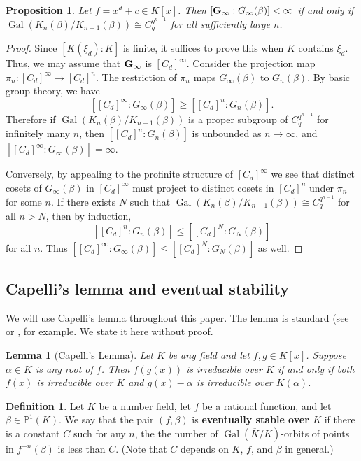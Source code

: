 \documentclass[11pt]{amsart}
\newtheorem{prop}[thm]{Proposition}
\newtheorem{lem}[thm]{Lemma}
\theoremstyle{definition}
\newtheorem{defn}[thm]{Definition}
\theoremstyle{definition}
\numberwithin{thm}{section}
\numberwithin{equation}{thm}
\newcommand{\bP}{\ensuremath{{\mathbb{P}}}}
\newcommand{\Kbar}{\ensuremath {\overline K}}
\DeclareMathOperator{\Gal}{Gal}
\begin{document}
\begin{prop}\label{indexprop}
Let $f=x^d+c\in K[x]$. Then $[{\bf G}_{\infty}: G_\infty(\beta)]<\infty$ if and only if $\Gal(K_n(\beta)/K_{n-1}(\beta))\cong C_q^{q^{n-1}}$ 
for all sufficiently large $n$.
\end{prop}
\begin{proof}
 Since $[K(\xi_d):K]$ is finite, it suffices to prove this when
 $K$ contains $\xi_d$.  Thus, we may assume that ${\bf G}_\infty$ is
 $[C_d]^\infty$.  
Consider the projection map $\pi_n:[C_d]^\infty\to[C_d]^n$. The restriction of $\pi_n$ maps $G_\infty(\beta)$ to 
$G_n(\beta)$. By basic group theory, we have
\[
[[C_d]^\infty:G_\infty(\beta)]\geq [[C_d]^n:G_n(\beta)].
\]
Therefore if $\Gal(K_n(\beta)/K_{n-1}(\beta))$ is a proper subgroup of $C_q^{q^{n-1}}$ for infinitely many $n$, then 
$[[C_d]^n:G_n(\beta)]$ is unbounded as $n\to\infty$, and $[[C_d]^\infty:G_\infty(\beta)]=\infty$.

Conversely, by appealing to the profinite structure of $[C_d]^\infty$ we see that distinct cosets of $G_\infty(\beta)$ in $[C_d]^\infty$ must 
project to distinct cosets in $[C_d]^n$ under $\pi_n$ for some $n$. If there exists $N$ such that $\Gal(K_n(\beta)/K_{n-1}(\beta))\cong C_q^{q^{n-1}}$ for all $n > N$, then by induction, 
\[[[C_d]^n:G_n(\beta)]\leq [[C_d]^N:G_N(\beta)]\] for all $n$. Thus $[[C_d]^\infty:G_\infty(\beta)]\leq [[C_d]^N:G_N(\beta)]$ as well.
\end{proof}


\subsection{Capelli's lemma and eventual stability}

We will use Capelli's lemma throughout this paper.  The lemma is
standard (see \cite{OdoniWreathProducts} or \cite[Lemma 4.1]{BT2}, for
example.  We state it here without proof.


\begin{lem}[Capelli's Lemma] \label{cap} 
Let $K$ be any field and let $f,g\in K[x]$. Suppose $\alpha\in\Kbar$ is any root of $f$. 
Then $f(g(x))$ is irreducible over $K$ if and only if both $f(x)$ is irreducible over $K$ and $g(x)-\alpha$ 
is irreducible over $K(\alpha)$.
\end{lem}

\begin{defn}\label{event}
  Let $K$ be a number field, let $f$ be a rational function, and let
  $\beta \in \bP^1(K)$.  We say that the pair $(f,\beta)$ is
  \textbf{eventually stable over $K$} if there is a constant $C$ such for any $n$, the
  the number of $\Gal({\overline K}/K)$-orbits of points in
  $f^{-n}(\beta)$ is less than $C$.  (Note that $C$ depends on $K$,
  $f$, and $\beta$ in general.)
\end{defn}
\end{document}
